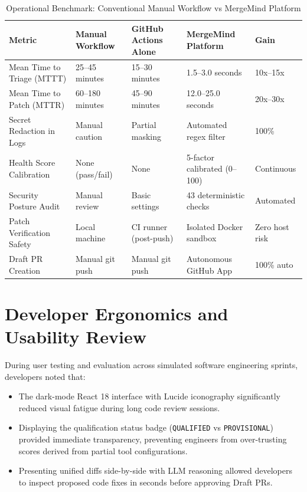 \begin{table}[htbp]
    \centering
    \caption{Operational Benchmark: Conventional Manual Workflow vs MergeMind Platform}
    \label{tab:operational-benchmark}
    \small
    \begin{tabularx}{\textwidth}{p{} p{} p{} p{} p{}}
        \toprule
        \textbf{Metric} & \textbf{Manual Workflow} & \textbf{GitHub Actions Alone} & \textbf{MergeMind Platform} & \textbf{Gain} \\
        \midrule
        Mean Time to Triage (MTTT) & 25--45 minutes & 15--30 minutes & 1.5--3.0 seconds & 10x--15x \\
        \addlinespace
        Mean Time to Patch (MTTR) & 60--180 minutes & 45--90 minutes & 12.0--25.0 seconds & 20x--30x \\
        \addlinespace
        Secret Redaction in Logs & Manual caution & Partial masking & Automated regex filter & 100\% \\
        \addlinespace
        Health Score Calibration & None (pass/fail) & None & 5-factor calibrated (0--100) & Continuous \\
        \addlinespace
        Security Posture Audit & Manual review & Basic settings & 43 deterministic checks & Automated \\
        \addlinespace
        Patch Verification Safety & Local machine & CI runner (post-push) & Isolated Docker sandbox & Zero host risk \\
        \addlinespace
        Draft PR Creation & Manual git push & Manual git push & Autonomous GitHub App & 100\% auto \\
        \bottomrule
    \end{tabularx}
\end{table}

\section{Developer Ergonomics and Usability Review}
\label{sec:disc-usability}

During user testing and evaluation across simulated software engineering sprints, developers noted that:
\begin{itemize}
    \item The dark-mode React 18 interface with Lucide iconography significantly reduced visual fatigue during long code review sessions.
    \item Displaying the qualification status badge (\texttt{QUALIFIED} vs \texttt{PROVISIONAL}) provided immediate transparency, preventing engineers from over-trusting scores derived from partial tool configurations.
    \item Presenting unified diffs side-by-side with LLM reasoning allowed developers to inspect proposed code fixes in seconds before approving Draft PRs.
\end{itemize}

